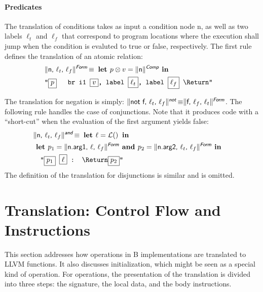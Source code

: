 \documentclass{llncs}
\newcommand{\trad}[2]{\ensuremath{\lVert \textsf{#1} \rVert^{\textit{#2}}}}
\newcommand{\nl}[0]{\text{\Return}}
\DeclareMathOperator{\isdef}{\equiv}
\DeclareMathOperator{\name}{\mathcal{L}()}
\newcommand{\llvm}[1]{\texttt{#1}}
\newcommand{\B}[1]{\textsf{#1}}
\newcommand{\LET}[0]{\textbf{ let }}
\newcommand{\IN}[0]{\textbf{ in }}
\newcommand{\AND}[0]{\textbf{ and }}
\newcommand{\PH}[1]{\framebox{$#1$}}
\newcommand{\sep}[0]{\otimes}
\begin{document}
\paragraph{Predicates}
The translation of conditions takes as input a condition node \B{n}, as well as
two labels $\ell_t$ and $\ell_f$ that correspond to program locations where the
execution shall jump when the condition is evaluted to true or false,
respectively.  The first rule defines the translation of an atomic relation:
\begin{align*}
  \lefteqn{\trad{n, $\ell_t$, $\ell_f$}{\B{Form}} \isdef
  \textbf{ let } p \sep v = \trad{n}{\B{Comp}} \IN} \\
  & \llvm{"\PH{p} \quad br i1 \PH{v}, label \PH{\ell_t}, label \PH{\ell_f} \nl"}
\end{align*}

\noindent The translation for negation is simply: $\trad{not f, $\ell_t$,
  $\ell_f$}{\B{not}} \isdef \trad{f, $\ell_f$, $\ell_t$}{\B{Form}}$.  The
following rule handles the case of conjunctions. Note that it produces code with
a ``short-cut'' when the evaluation of the first argument yields false:
\begin{align*}
\begin{split}
  \lefteqn{\trad{n, $\ell_t$, $\ell_f$}{\B{and}} \isdef \LET \ell = \name \IN} \\
  & \LET p_1 = \trad{n.arg1, $\ell$, $\ell_f$}{\B{Form}}
  \AND p_2 = \trad{n.arg2, $\ell_t$, $\ell_f$}{\B{Form}} \IN \\
  & \quad \llvm{"\PH{p_1} \PH{\ell} :  \nl \PH{p_2}"}
\end{split}
\end{align*}
The definition of the translation for disjunctions is similar and is omitted.

\section{Translation: Control Flow and Instructions
  \label{sec:control}}

This section addresses how operations in B implementations are translated to
LLVM functions. It also discusses initialization, which might be seen as a
special kind of operation. For operations, the presentation of the translation
is divided into three steps: the signature, the local data, and the body
instructions.
\end{document}
